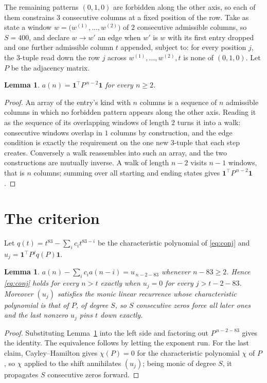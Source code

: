 \documentclass[11pt,a4paper]{article}
\theoremstyle{plain}
\newtheorem{lemma}[theorem]{Lemma}
\theoremstyle{definition}
\begin{document}
The remaining patterns $(0,1,0)$ are forbidden along the other axis, so each of them
constrains $3$ consecutive columns at a fixed position of the row. Take as state a
window $w=\bigl(w^{(1)},\dots,w^{(2)}\bigr)$ of $2$ consecutive admissible
columns, so $S=400$, and declare $w\to w'$ an edge when $w'$ is $w$ with its first entry
dropped and one further admissible column $t$ appended, subject to: for every position
$j$, the $3$-tuple read down the row $j$ across $w^{(1)},\dots,w^{(2)},t$
is none of $(0,1,0)$. Let $P$ be the adjacency matrix.

\begin{lemma}\label{lem:walk}
$a(n)=\mathbf{1}^{\!\top}P^{\,n-2}\mathbf{1}$ for every $n\ge2$.
\end{lemma}

\begin{proof}
An array of the entry's kind with $n$ columns is a sequence of $n$ admissible columns in
which no forbidden pattern appears along the other axis. Reading it as the sequence of its
overlapping windows of length $2$ turns it into a walk: consecutive windows overlap in
$1$ columns by construction, and the edge condition is exactly the requirement on the one
new $3$-tuple that each step creates. Conversely a walk reassembles into such an array,
and the two constructions are mutually inverse. A walk of length $n-2$ visits $n-1$
windows, that is $n$ columns; summing over all starting and ending states gives
$\mathbf{1}^{\!\top}P^{\,n-2}\mathbf{1}$.
\end{proof}

\section{The criterion}

Let $q(t)=t^{83}-\sum_i c_i t^{83-i}$ be the characteristic polynomial of
\eqref{eq:conj} and $u_j=\mathbf{1}^{\!\top}P^{j}q(P)\mathbf{1}$.

\begin{lemma}\label{lem:crit}
$a(n)-\sum_i c_i a(n-i)=u_{\,n-2-83}$ whenever $n-83\ge2$. Hence
\eqref{eq:conj} holds for every $n>t$ exactly when $u_j=0$ for every
$j>t-2-83$. Moreover $(u_j)$ satisfies the monic linear recurrence whose
characteristic polynomial is that of $P$, of degree $S$, so $S$ consecutive zeros force all
later ones and the last nonzero $u_j$ pins $t$ down exactly.
\end{lemma}

\begin{proof}
Substituting Lemma~\ref{lem:walk} into the left side and factoring out
$P^{\,n-2-83}$ gives the identity. The equivalence follows by letting the exponent
run. For the last claim, Cayley--Hamilton gives $\chi(P)=0$ for the characteristic
polynomial $\chi$ of $P$, so $\chi$ applied to the shift annihilates $(u_j)$; being monic of
degree $S$, it propagates $S$ consecutive zeros forward.
\end{proof}
\end{document}
